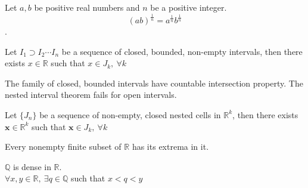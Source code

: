 	\begin{corollary}
		Let $a,b$ be positive real numbers and $n$ be a positive integer.
		$$(ab)^\frac{1}{n} = a^\frac{1}{n} b^\frac{1}{n}$$.
	\end{corollary}
	\begin{theorem}
		Let $I_1 \supset I_2 \cdots I_n$ be a sequence of closed, bounded, non-empty intervals, then there exists $x \in \mathbb{R}$ such that $x \in J_k,\ \forall k$
	\end{theorem}
	\begin{remark}
		The family of closed, bounded intervals have countable intersection property.
		The nested interval theorem fails for open intervals.
	\end{remark}
	\begin{theorem}
		Let $\{ J_n \}$ be a sequence of non-empty, closed nested cells in $\mathbb{R}^k$, then there exists $\textbf{x} \in \mathbb{R}^k$ such that $\textbf{x} \in J_k,\ \forall k$
	\end{theorem}
	\begin{theorem}
		Every nonempty finite subset of $\mathbb{R}$ has its extrema in it.
	\end{theorem}
	\begin{theorem}
		$\mathbb{Q}$ is dense in $\mathbb{R}$.\\ 
		$\forall x,y \in \mathbb{R},\ \exists q \in \mathbb{Q}$ such that $x < q < y$
	\end{theorem}
